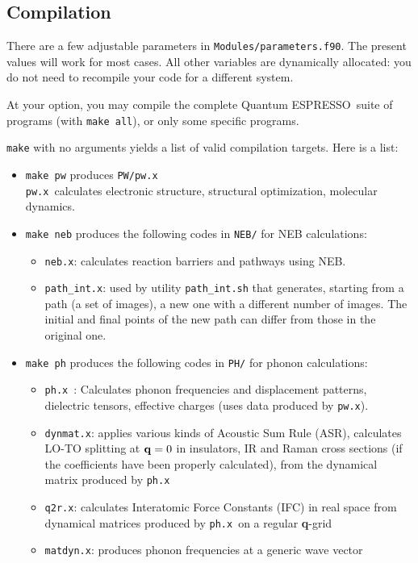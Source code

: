 \documentclass[12pt,a4paper]{article}
\def\qe{{\sc Quantum ESPRESSO}}
\def\pwx{\texttt{pw.x}}
\def\phx{\texttt{ph.x}}
\def\nebx{\texttt{neb.x}}
\begin{document}
\subsection{Compilation}

There are a few adjustable parameters in \texttt{Modules/parameters.f90}. 
The
present values will work for most cases. All other variables are dynamically
allocated: you do not need to recompile your code for a different system.
    
At your option, you may compile the complete \qe\ suite of programs 
(with \texttt{make all}), or only some specific programs.

\texttt{make} with no arguments yields a list of valid compilation targets. 
Here is a list:
\begin{itemize}
\item \texttt{make pw} produces \texttt{PW/pw.x} \\
\pwx\ calculates electronic structure, structural optimization, molecular dynamics.
\item \texttt{make neb} produces the following codes in \texttt{NEB/}
for NEB calculations:
\begin{itemize}
\item \nebx: calculates reaction barriers and pathways using NEB.
\item \texttt{path\_int.x}: used by utility \texttt{path\_int.sh}
  that generates, starting from a path (a set of images), a new one with a 
  different number of images. The initial and final points of the new
 path can differ from those in the original one. 
\end{itemize}
\item \texttt{make ph} produces the following codes in \texttt{PH/}
for phonon calculations:
\begin{itemize}
  \item \phx\ : Calculates phonon frequencies and displacement patterns,
    dielectric tensors, effective charges (uses data produced by \pwx). 
  \item \texttt{dynmat.x}: applies various kinds of Acoustic Sum Rule (ASR),
    calculates LO-TO splitting at ${\bf q} = 0$ in insulators, IR and Raman
    cross sections (if the coefficients have been properly calculated),
    from the dynamical matrix produced by \phx
  \item \texttt{q2r.x}: calculates Interatomic Force Constants (IFC) in real space
    from dynamical matrices produced by \phx\ on a regular {\bf q}-grid 
 \item \texttt{matdyn.x}: produces phonon frequencies at a generic wave vector

\end{itemize}
\end{itemize}
\end{document}
